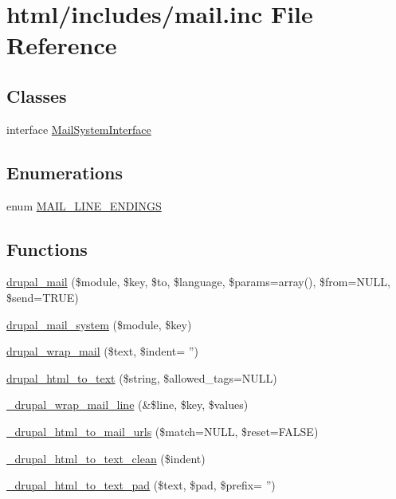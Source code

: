 \hypertarget{mail_8inc}{
\section{html/includes/mail.inc File Reference}
\label{mail_8inc}
}
\subsection*{Classes}
\begin{DoxyCompactItemize}
\item 
interface \hyperlink{interfaceMailSystemInterface}{MailSystemInterface}
\end{DoxyCompactItemize}
\subsection*{Enumerations}
\begin{DoxyCompactItemize}
\item 
enum \hyperlink{mail_8inc_a135ed72a6f5c8f9693153def270569d9}{MAIL\_\-LINE\_\-ENDINGS} 
\end{DoxyCompactItemize}
\subsection*{Functions}
\begin{DoxyCompactItemize}
\item 
\hyperlink{mail_8inc_ab80781fd7273975a77cbbd13300eddbf}{drupal\_\-mail} (\$module, \$key, \$to, \$language, \$params=array(), \$from=NULL, \$send=TRUE)
\item 
\hyperlink{mail_8inc_a6ba240b2e368447935c9bcb114f59a1a}{drupal\_\-mail\_\-system} (\$module, \$key)
\item 
\hyperlink{mail_8inc_a955ffecc70c15ab89079ea29557f7b41}{drupal\_\-wrap\_\-mail} (\$text, \$indent= '')
\item 
\hyperlink{mail_8inc_a1d324056cce089d2fc06dedee5b6e92e}{drupal\_\-html\_\-to\_\-text} (\$string, \$allowed\_\-tags=NULL)
\item 
\hyperlink{mail_8inc_a0bd2970cd3a1907c69945f82c22fedbf}{\_\-drupal\_\-wrap\_\-mail\_\-line} (\&\$line, \$key, \$values)
\item 
\hyperlink{mail_8inc_af00e85f84e5f0323c0f2f81ed98b6383}{\_\-drupal\_\-html\_\-to\_\-mail\_\-urls} (\$match=NULL, \$reset=FALSE)
\item 
\hyperlink{mail_8inc_a39b43a9d0ba9add51b67e103c7fbc16e}{\_\-drupal\_\-html\_\-to\_\-text\_\-clean} (\$indent)
\item 
\hyperlink{mail_8inc_a54f26f0265b1eab148753bb7a72c3d09}{\_\-drupal\_\-html\_\-to\_\-text\_\-pad} (\$text, \$pad, \$prefix= '')
\end{DoxyCompactItemize}


